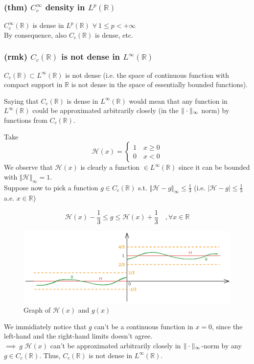 \subsubsection{(thm) $C_c^\infty$ density in $L^p(\mathbb R)$}
$C_c^\infty(\mathbb R)$ is dense in $L^p(\mathbb R)$ $\forall\ 1\leq p<+\infty$\\
By consequence, also $C_c(\mathbb R)$ is dense, etc.
\subsubsection{(rmk) $C_c(\mathbb R)$ is not dense in $L^\infty(\mathbb R)$}
$C_c(\mathbb R)\subset L^\infty(\mathbb R)$ is not dense (i.e. the space of continuous function with compact support in $\mathbb R$ is not dense in the space of essentially bounded functions).

Saying that $C_c(\mathbb R)$ is dense in $L^\infty(\mathbb R)$ would mean that any function in $L^\infty(\mathbb R)$ could be approximated arbitrarily closely (in the $\Vert \cdot \Vert_\infty$ norm) by functions from $C_c(\mathbb R)$.


Take
$$\mathcal H(x) =\begin{cases}
    1\quad x\geq0\\0\quad x<0
\end{cases}$$
We observe that $\mathcal H(x)$ is clearly a function $\in L^\infty(\mathbb R)$ since it can be bounded with $\Vert\mathcal H\Vert_\infty=1$.\\
Suppose now to pick a function $g\in C_c(\mathbb R)$ s.t. $\Vert \mathcal H-g\Vert_\infty \leq \frac 13$ (i.e. $| \mathcal H-g| \leq \frac 13$ a.e. $x\in \mathbb R$)

$$\mathcal H(x)-\frac{1}{3}\leq g\leq \mathcal H(x)+\frac 13\quad , \forall x\in \mathbb R$$
\begin{figure}[h]
    \centering
    \includegraphics[width=0.9\linewidth]{assets/heaviside_cartoon.png}
    \caption{Graph of $\mathcal H(x)$ and $g(x)$}
    \label{fig:enter-label}
\end{figure}

We immidiately notice that $g$ can't be a continuous function in $x=0$, since the left-hand and the right-hand limits doesn't agree.\\
$\implies \ g$ $\mathcal H(x)$ can't be approximated arbitrarily closely in $\Vert \cdot \Vert_\infty$-norm by any $g\in C_c(\mathbb R)$. Thus, $C_c(\mathbb R)$ is not dense in $L^\infty(\mathbb R)$.

